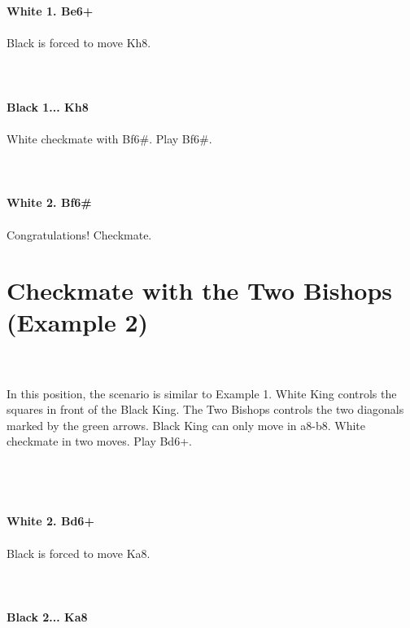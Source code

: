 \documentclass{article}
\begin{document}

\\
\\
\textbf{White 1. Be6+}\\
\\
Black is forced to move Kh8.\\
\\

\\
\\
\textbf{Black 1... Kh8}\\
\\
White checkmate with Bf6\#. Play Bf6\#.\\
\\

\\
\\
\textbf{White 2. Bf6\#}\\
\\
Congratulations! Checkmate.\\\section{ Checkmate with the Two Bishops (Example 2)}

\\
\\
In this position, the scenario is similar to Example 1. White King controls the squares in front of the Black King. The Two Bishops controls the two diagonals marked by the green arrows. Black King can only move in a8-b8. White checkmate in two moves. Play Bd6+.\\\\
\\

\\
\\
\textbf{White 2. Bd6+}\\
\\
Black is forced to move Ka8.\\
\\

\\
\\
\textbf{Black 2... Ka8}\\
\\
\end{document}

